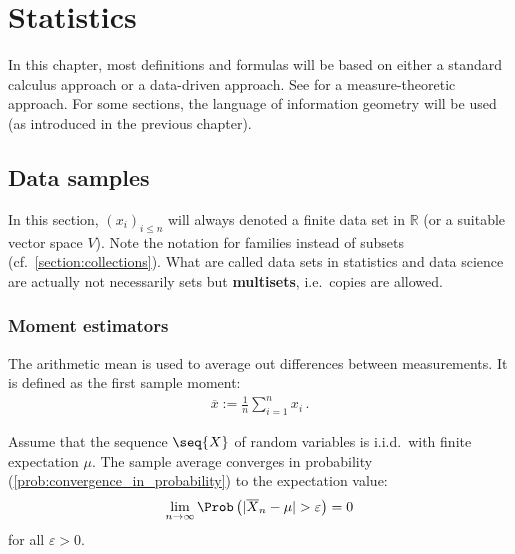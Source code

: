 \chapter{Statistics}\label{chapter:statistics}

    In this chapter, most definitions and formulas will be based on either a standard calculus approach or a data-driven approach. See  for a measure-theoretic approach. For some sections, the language of information geometry will be used (as introduced in the previous chapter).

    \minitoc

\section{Data samples}

    In this section, $(x_i)_{i\leq n}$ will always denoted a finite data set in $\mathbb{R}$ (or a suitable vector space $V$). Note the notation for families instead of subsets (cf.~\cref{section:collections}). What are called data sets in statistics and data science are actually not necessarily sets but \textbf{multisets}, i.e.~copies are allowed.

\subsection{Moment estimators}

    \begin{example}\label{statistics:arithmetic_mean}
        The arithmetic mean is used to average out differences between measurements. It is defined as the first sample moment:
        \begin{gather}
            \overline{x} := \frac{1}{n}\sum_{i=1}^nx_i\,.
        \end{gather}
    \end{example}

    \begin{theorem}
        Assume that the sequence $\seq{X}$ of random variables is i.i.d.~with finite expectation $\mu$. The sample average converges in probability (\cref{prob:convergence_in_probability}) to the expectation value:
        \begin{gather}
            \lim_{n\rightarrow\infty}\Prob\left(|\overline{X}_n-\mu|>\varepsilon\right)=0
        \end{gather}
        for all $\varepsilon>0$.
    \end{theorem}

